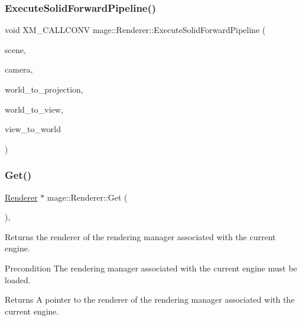\hypertarget{classmage_1_1_renderer_af262c5909fc943477d9723828987c0d5}{}\label{classmage_1_1_renderer_af262c5909fc943477d9723828987c0d5} 
\subsubsection{\texorpdfstring{Execute\+Solid\+Forward\+Pipeline()}{ExecuteSolidForwardPipeline()}}
{\footnotesize\ttfamily void X\+M\+\_\+\+C\+A\+L\+L\+C\+O\+NV mage\+::\+Renderer\+::\+Execute\+Solid\+Forward\+Pipeline (\begin{DoxyParamCaption}\item[{const \hyperlink{classmage_1_1_scene}{Scene} \&}]{scene,  }\item[{const \hyperlink{classmage_1_1_camera}{Camera} \&}]{camera,  }\item[{F\+X\+M\+M\+A\+T\+R\+IX}]{world\+\_\+to\+\_\+projection,  }\item[{C\+X\+M\+M\+A\+T\+R\+IX}]{world\+\_\+to\+\_\+view,  }\item[{C\+X\+M\+M\+A\+T\+R\+IX}]{view\+\_\+to\+\_\+world }\end{DoxyParamCaption})\hspace{0.3cm}{\ttfamily [private]}}

\hypertarget{classmage_1_1_renderer_a401f8e17f60d8546b30de22943ac35db}{}\label{classmage_1_1_renderer_a401f8e17f60d8546b30de22943ac35db} 
\subsubsection{\texorpdfstring{Get()}{Get()}}
{\footnotesize\ttfamily \hyperlink{classmage_1_1_renderer}{Renderer} $\ast$ mage\+::\+Renderer\+::\+Get (\begin{DoxyParamCaption}{ }\end{DoxyParamCaption})\hspace{0.3cm}{\ttfamily [static]}, {\ttfamily [noexcept]}}

Returns the renderer of the rendering manager associated with the current engine.

\begin{DoxyPrecond}{Precondition}
The rendering manager associated with the current engine must be loaded. 
\end{DoxyPrecond}
\begin{DoxyReturn}{Returns}
A pointer to the renderer of the rendering manager associated with the current engine. 
\end{DoxyReturn}
\hypertarget{classmage_1_1_renderer_a52fd71822fe54161ad505a0361ec6c75}{}\label{classmage_1_1_renderer_a52fd71822fe54161ad505a0361ec6c75} 
